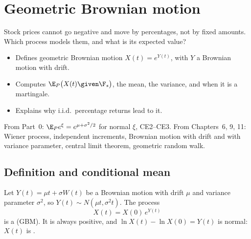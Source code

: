 \chapter{Geometric Brownian motion}
\label{ch:gbm}

\begin{question}
Stock prices cannot go negative and move by percentages, not by fixed amounts. Which process models them, and what is its expected value?
\end{question}

\begin{whatfor}
\begin{itemize}
  \item Defines geometric Brownian motion $X(t)=e^{Y(t)}$, with $Y$ a Brownian motion with drift.
  \item Computes $\E_P\big(X(t)\given\F_s\big)$, the mean, the variance, and when it is a martingale.
  \item Explains why i.i.d.\ percentage returns lead to it.
\end{itemize}
\end{whatfor}

\begin{prereq}
From Part~0: $\E_Pe^{\xi}=e^{\mu+\sigma^2/2}$ for normal $\xi$, CE2--CE3. From Chapters~6, 9, 11: Wiener process, independent increments, Brownian motion with drift and with variance parameter, central limit theorem, geometric random walk.
\end{prereq}

\section{Definition and conditional mean}

\begin{definition}
\label{def:gbm}
Let $Y(t)=\mu t+\sigma W(t)$ be a Brownian motion with drift $\mu$ and variance parameter $\sigma^2$, so $Y(t)\sim N(\mu t,\sigma^2t)$. The process
\[
  X(t)=X(0)\,e^{Y(t)}
\]
is a  (GBM). It is always positive, and $\ln X(t)-\ln X(0)=Y(t)$ is normal: $X(t)$ is .
\end{definition}

